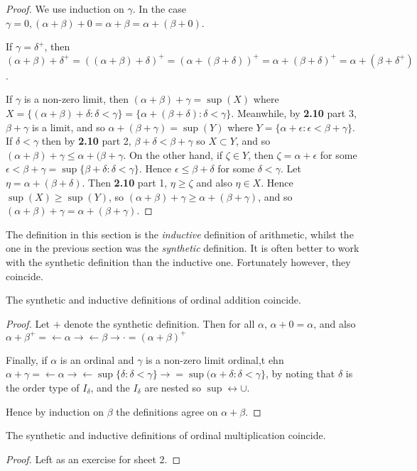 \documentclass[10pt,a4paper]{article}
\begin{document}
\begin{proof}
We use induction on $\gamma$. In the case $\gamma = 0, (\alpha + \beta) + 0 = \alpha + \beta = \alpha + (\beta + 0)$.

If $\gamma = \delta^+$, then $(\alpha + \beta) + \delta^+ = ((\alpha+\beta) + \delta)^+ = (\alpha + (\beta + \delta))^+ = \alpha + (\beta+\delta)^+ = \alpha + (\beta+ \delta^+)$.


If $\gamma$ is a non-zero limit, then $(\alpha + \beta) + \gamma = \sup(X)$ where $X = \{(\alpha+\beta)+\delta : \delta < \gamma\} = \{\alpha + (\beta+\delta) : \delta < \gamma\}$. Meanwhile, by \textbf{2.10} part 3, $\beta + \gamma$ is a limit, and so $\alpha + (\beta+ \gamma) = \sup(Y)$ where $Y = \{\alpha + \epsilon : \epsilon < \beta + \gamma\}$. If $\delta < \gamma$ then by \textbf{2.10} part 2, $\beta+ \delta < \beta + \gamma$ so $X \subset Y$, and so $(\alpha + \beta) + \gamma \leq \alpha + (\beta+\gamma$. On the other hand, if $\zeta \in Y$, then $\zeta = \alpha + \epsilon$ for some $\epsilon < \beta + \gamma = \sup\{\beta + \delta : \delta  < \gamma\}$. Hence $\epsilon \leq \beta + \delta$ for some $\delta < \gamma$. Let $\eta = \alpha + (\beta + \delta)$. Then \textbf{2.10} part 1, $\eta \geq \zeta$ and also $\eta \in X$. Hence $\sup(X) \geq \sup(Y)$, so $(\alpha + \beta) + \gamma \geq \alpha + (\beta+\gamma)$, and so $(\alpha+\beta)+\gamma = \alpha +(\beta+\gamma)$.
\end{proof}

The definition in this section is the \emph{inductive} definition of arithmetic, whilst the one in the previous section was the \emph{synthetic} definition. It is often better to work with the synthetic definition than the inductive one. Fortunately however, they coincide.

\begin{proposition}
The synthetic and inductive definitions of ordinal addition coincide.
\end{proposition}
\begin{proof}
Let $+$ denote the synthetic definition. Then for all $\alpha$, $\alpha + 0 = \alpha$, and also $\alpha+\beta^+ = \leftarrow \alpha \rightarrow \leftarrow \beta \rightarrow \cdot = (\alpha+\beta)^+$

Finally, if $\alpha$ is an ordinal and $\gamma$ is a non-zero limit ordinal,t ehn $\alpha + \gamma = \leftarrow \alpha \rightarrow \leftarrow \sup\{\delta:\delta<\gamma\}\rightarrow = \sup(\alpha+\delta: \delta <\gamma\}$, by noting that $\delta$ is the order type of $I_{\delta}$, and the $I_{\delta}$ are nested so $\sup \leftrightarrow \cup$.

Hence by induction on $\beta$ the definitions agree on $\alpha + \beta$.
\end{proof}
\begin{proposition}
The synthetic and inductive definitions of ordinal multiplication coincide.
\end{proposition}
\begin{proof}
Left as an exercise for sheet 2.
\end{proof}
\end{document}
